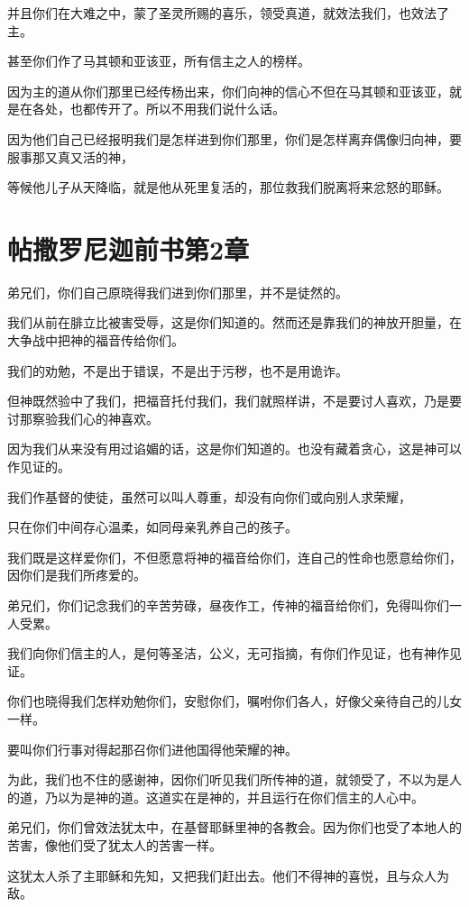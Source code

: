 \documentclass[12pt,oneside]{book}
\begin{document}
并且你们在大难之中，蒙了圣灵所赐的喜乐，领受真道，就效法我们，也效法了主。

甚至你们作了马其顿和亚该亚，所有信主之人的榜样。

因为主的道从你们那里已经传杨出来，你们向神的信心不但在马其顿和亚该亚，就是在各处，也都传开了。所以不用我们说什么话。

因为他们自己已经报明我们是怎样进到你们那里，你们是怎样离弃偶像归向神，要服事那又真又活的神，

等候他儿子从天降临，就是他从死里复活的，那位救我们脱离将来忿怒的耶稣。

\chapter{帖撒罗尼迦前书第2章}
弟兄们，你们自己原晓得我们进到你们那里，并不是徒然的。

我们从前在腓立比被害受辱，这是你们知道的。然而还是靠我们的神放开胆量，在大争战中把神的福音传给你们。

我们的劝勉，不是出于错误，不是出于污秽，也不是用诡诈。

但神既然验中了我们，把福音托付我们，我们就照样讲，不是要讨人喜欢，乃是要讨那察验我们心的神喜欢。

因为我们从来没有用过谄媚的话，这是你们知道的。也没有藏着贪心，这是神可以作见证的。

我们作基督的使徒，虽然可以叫人尊重，却没有向你们或向别人求荣耀，

只在你们中间存心温柔，如同母亲乳养自己的孩子。

我们既是这样爱你们，不但愿意将神的福音给你们，连自己的性命也愿意给你们，因你们是我们所疼爱的。

弟兄们，你们记念我们的辛苦劳碌，昼夜作工，传神的福音给你们，免得叫你们一人受累。

我们向你们信主的人，是何等圣洁，公义，无可指摘，有你们作见证，也有神作见证。

你们也晓得我们怎样劝勉你们，安慰你们，嘱咐你们各人，好像父亲待自己的儿女一样。

要叫你们行事对得起那召你们进他国得他荣耀的神。

为此，我们也不住的感谢神，因你们听见我们所传神的道，就领受了，不以为是人的道，乃以为是神的道。这道实在是神的，并且运行在你们信主的人心中。

弟兄们，你们曾效法犹太中，在基督耶稣里神的各教会。因为你们也受了本地人的苦害，像他们受了犹太人的苦害一样。

这犹太人杀了主耶稣和先知，又把我们赶出去。他们不得神的喜悦，且与众人为敌。
\end{document}
